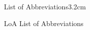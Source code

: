 
\begin{mclistof}{List of Abbreviations}{3.2cm}

\item[LoA] List of Abbreviations



\end{mclistof} 
